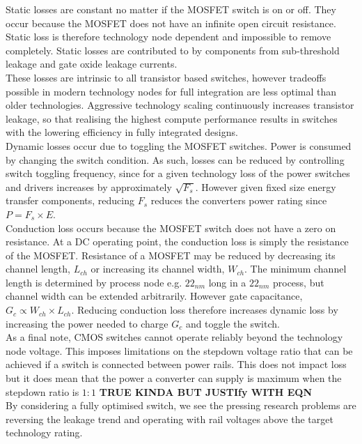 \documentclass[letterpaper,twocolumn,10pt]{article}
\begin{document}
Static losses are constant no matter if the MOSFET switch is on or off. They occur because the MOSFET does not have an infinite open circuit resistance. Static loss is therefore technology node dependent and impossible to remove completely. Static losses are contributed to by components from sub-threshold leakage and gate oxide leakage currents.\\
These losses are intrinsic to all transistor based switches, however tradeoffs possible in modern technology nodes for full integration are less optimal than older technologies. Aggressive technology scaling continuously increases transistor leakage\cite{Iwai2009}, so that realising the highest compute performance results in switches with the lowering efficiency in fully integrated designs.\\
Dynamic losses occur due to toggling the MOSFET switches. Power is consumed by changing the switch condition. As such, losses can be reduced by controlling switch toggling frequency, since for a given technology loss of the power switches and drivers increases by approximately $\sqrt{F_s}$\cite{Andreou1999}. However given fixed size energy transfer components, reducing $F_s$ reduces the converters power rating since $P = F_s \times E$.\\
Conduction loss occurs because the MOSFET switch does not have a zero on resistance. At a DC operating point, the conduction loss is simply the resistance of the MOSFET. Resistance of a MOSFET may be reduced by decreasing its channel length, $L_{ch}$ or increasing its channel width, $W_{ch}$. The minimum channel length is determined by process node e.g. $22_{nm}$ long in a $22_{nm}$ process, but channel width can be extended arbitrarily. However gate capacitance, $G_c \propto W_{ch} \times L_{ch}$. Reducing conduction loss therefore increases dynamic loss by increasing the power needed to charge $G_c$ and toggle the switch.\\  
\indent As a final note, CMOS switches cannot operate reliably beyond the technology node voltage. This imposes limitations on the stepdown voltage ratio that can be achieved if a switch is connected between power rails. This does not impact loss but it does mean that the power a converter can supply is maximum when the stepdown ratio is $1:1$ \textbf{TRUE KINDA BUT JUSTIfy WITH EQN}\\
\indent By considering a fully optimised switch, we see the pressing research problems are reversing the leakage trend\cite{Iwai2009} and operating with rail voltages above the target technology rating.\\ 
\end{document}
